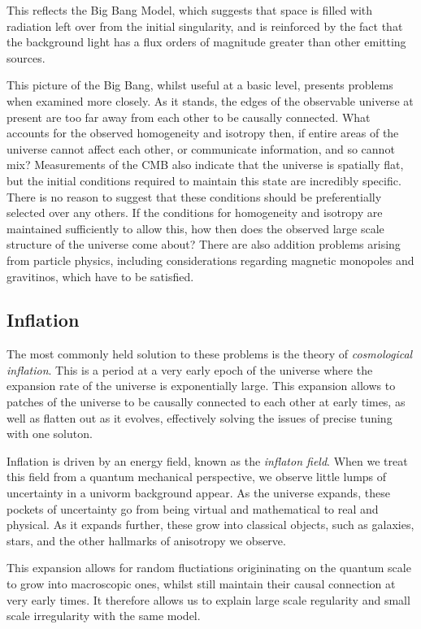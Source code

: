 This reflects the Big Bang Model, which suggests that space is filled with radiation left over from the initial singularity, and is reinforced by the fact that the background light has a flux orders of magnitude greater than other emitting sources.
\par This picture of the Big Bang, whilst useful at a basic level, presents problems when examined more closely. As it stands, the edges of the observable universe at present are too far away from each other to be causally connected. What accounts for the observed homogeneity and isotropy then, if entire areas of the universe cannot affect each other, or communicate information, and so cannot mix? Measurements of the CMB also indicate that the universe is spatially flat, but the initial conditions required to maintain this state are incredibly specific. There is no reason to suggest that these conditions should be preferentially selected over any others. If the conditions for homogeneity and isotropy are maintained sufficiently to allow this, how then does the observed large scale structure of the universe come about? There are also addition problems arising from particle physics, including considerations regarding magnetic monopoles and gravitinos, which have to be satisfied.

\subsection{Inflation}
The most commonly held solution to these problems is the theory of \emph{cosmological inflation}\cite{Linde:07}. This is a period at a very early epoch of the universe where the expansion rate of the universe is exponentially large. This expansion allows to patches of the universe to be causally connected to each other at early times, as well as flatten out as it evolves, effectively solving the issues of precise tuning with one soluton.

Inflation is driven by an energy field, known as the \emph{inflaton field}. When we treat this field from a quantum mechanical perspective, we observe little lumps of uncertainty in a univorm background appear. As the universe expands, these pockets of uncertainty go from being virtual and mathematical to real and physical. As it expands further, these grow into classical objects, such as galaxies, stars, and the other hallmarks of anisotropy we observe.

This expansion allows for random fluctiations origininating on the quantum scale to grow into macroscopic ones, whilst still maintain their causal connection at very early times. It therefore allows us to explain large scale regularity and small scale irregularity with the same model.

